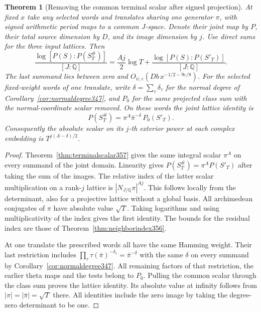 \documentclass[a4paper,11pt]{article}
\newtheorem{theorem}[proposition]{Theorem}
\theoremstyle{definition}
\theoremstyle{remark}
\numberwithin{equation}{section}
\begin{document}
\begin{theorem}[Removing the common terminal scalar after signed projection]\leavevmode
\label{thm:normalizedimage357}
At fixed \(x\) take any selected words and translates sharing
one generator \(\pi\), with signed arithmetic period maps to a
common \(J\)-space. Denote their joint map by \(P\), their
total source dimension by \(D\), and its image dimension by
\(j\). Use direct sums for the three input lattices. Then
\[
 \frac{\log[P(S):P(S^\#_T)]}{[J:\mathbb Q]}
       =\frac{Aj}{2}\log T+
                    \frac{\log[P(S):P(S'_T)]}{[J:\mathbb Q]} .
\]
The last summand lies between zero and
\(O_{\psi,\varepsilon}(D b\,x^{-1/2-9\varepsilon/8})\).
For the selected fixed-weight words of one translate, write
\(\delta=\sum_\tau\delta_\tau\) for the normal degree of
Corollary~\ref{cor:normaldegree347}, and \(P_0\) for the
same projected class sum with the normal-coordinate scalar
removed. On these words the joint lattice identity is
\[
                  P(S^\#_T)=\pi^A\bar\pi^{-\delta}\,P_0(S'_T).
\]
Consequently the absolute scalar on its \(j\)-th exterior
power at each complex embedding is \(T^{j(A-\delta)/2}\).
\end{theorem}
\begin{proof}
Theorem~\ref{thm:terminalscalar357} gives the same integral
scalar \(\pi^A\) on every summand of the joint domain. Linearity
gives \(P(S^\#_T)=\pi^A P(S'_T)\) after taking the sum of
the images. The relative index of the latter scalar multiplication
on a rank-\(j\) lattice is
\(|N_{J/\mathbb Q}\pi|^{Aj}\). This follows locally from the
determinant, also for a projective lattice without a global basis.
All archimedean conjugates of \(\pi\) have absolute value
\(\sqrt T\). Taking logarithms and using multiplicativity of
the index gives the first identity. The bounds for the residual
index are those of Theorem~\ref{thm:neighborindex356}.

At one translate the prescribed words all have the same
Hamming weight. Their last restriction includes
\(\prod_{\tau}\tau(\bar\pi)^{-\delta_\tau}=\bar\pi^{-\delta}\)
with the same \(\delta\) on every summand by
Corollary~\ref{cor:normaldegree347}. All remaining factors
of that restriction, the earlier theta maps and the tests
belong to \(P_0\). Pulling the common scalar through the
class sum proves the lattice identity. Its absolute value at
infinity follows from \(|\pi|=|\bar\pi|=\sqrt T\) there.
All identities include the zero image by taking the degree-zero
determinant to be one.
\end{proof}
\end{document}

